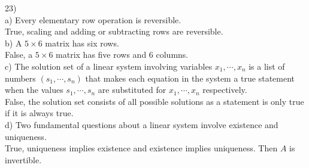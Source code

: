 \documentclass[]{article}
\begin{document}
23) \\
a) Every elementary row operation is reversible.\\
True, scaling and adding or subtracting rows are reversible.\\

b) A $5\times6$ matrix has six rows.\\
False, a $5\times6$ matrix has five rows and 6 columns.\\

c) The solution set of a linear system involving variables $x_1, \cdots, x_n$ is a list of numbers $(s_1,\cdots,s_n)$ that makes each equation in the system a true statement when the values $s_1,\cdots,s_n$ are substituted for $x_1,\cdots, x_n$ respectively.\\
False, the solution set consists of all possible solutions as a statement is only true if it is always true. \\

d) Two fundamental questions about a linear system involve existence and uniqueness.\\
True, uniqueness implies existence and existence implies uniqueness. Then $A$ is invertible.\\
\end{document}
